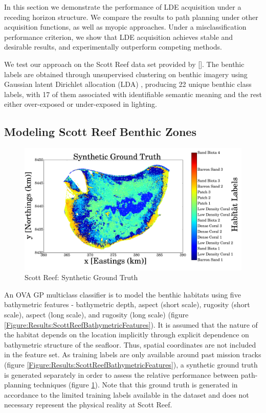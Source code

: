 \documentclass{article}
\newcommand{\incite}[1]{\citeauthor{#1} [\citeyear{#1}]}
\begin{document}
	In this section we demonstrate the performance of LDE acquisition under a receding horizon structure. We compare the results to path planning under other acquisition functions, as well as myopic approaches. Under a misclassification performance criterion, we show that LDE acquisition achieves stable and desirable results, and experimentally outperform competing methods.
	
	We test our approach on the Scott Reef data set provided by \incite{IMOS}. The benthic labels are obtained through unsupervised clustering on benthic imagery using Gaussian latent Dirichlet allocation (LDA) \cite{Steinberg2015128}, producing 22 unique benthic class labels, with 17 of them associated with identifiable semantic meaning and the rest either over-exposed or under-exposed in lighting. 

	\subsection{Modeling Scott Reef Benthic Zones}

		\begin{figure}[t]
		\fontsize{24}{12}\selectfont
		\centering
			\includegraphics[width = \linewidth]{Figures/scott_reef_modeling/Figure7-eps-converted-to.png}
		\caption{Scott Reef: Synthetic Ground Truth}
		\label{Figure:Results:ScottReefSyntheticGroundTruth}
		\end{figure}
		
		An OVA GP multiclass classifier is to model the benthic habitats using five bathymetric features - bathymetric depth, aspect (short scale), rugosity (short scale), aspect (long scale), and rugosity (long scale) (figure \ref{Figure:Results:ScottReefBathymetricFeatures}). It is assumed that the nature of the habitat depends on the location implicitly through explicit dependence on bathymetric structure of the seafloor. Thus, spatial coordinates are not included in the feature set. As training labels are only available around past mission tracks (figure \ref{Figure:Results:ScottReefBathymetricFeatures}), a synthetic ground truth is generated separately in order to assess the relative performance between path-planning techniques (figure \ref{Figure:Results:ScottReefSyntheticGroundTruth}). Note that this ground truth is generated in accordance to the limited training labels available in the dataset and does not necessary represent the physical reality at Scott Reef. 
\end{document}
